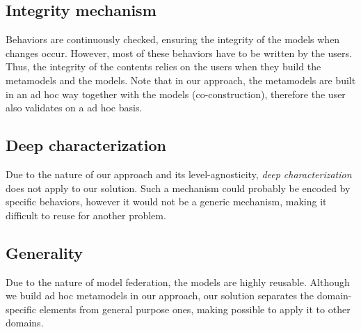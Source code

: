   \subsection{Integrity mechanism}


  Behaviors are continuously checked, ensuring the integrity of the models when
  changes occur. However, most of these behaviors have to be written by the
  users. Thus, the integrity of the contents relies on the users when they
  build the metamodels and the models.  Note that in our approach, the
  metamodels are built in an ad hoc way together with the models
  (co-construction), therefore the user also validates on a ad hoc basis.

  \subsection{Deep characterization}


  Due to the nature of our approach and its level-agnosticity, \emph{deep characterization} does not 
  apply to our solution. Such a mechanism could probably be encoded by specific behaviors, however 
  it would not be a generic mechanism, making it difficult to reuse for another problem.

  \subsection{Generality}


  Due to the nature of model federation, the models are highly reusable.
  Although we build ad hoc metamodels in our approach, our solution separates
  the domain-specific elements from general purpose ones, making possible to 
  apply it to other domains. 

